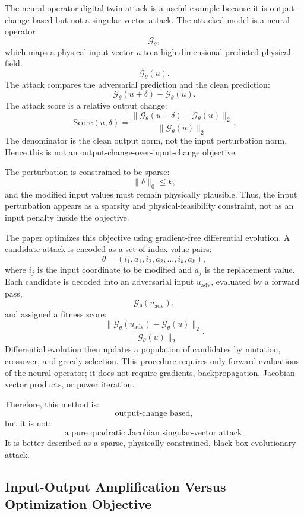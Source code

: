 \documentclass{article}
\begin{document}
The neural-operator digital-twin attack is a useful example because it is output-change based but not a singular-vector attack. The attacked model is a neural operator
\[
    \mathcal{G}_\theta,
\]
which maps a physical input vector \(u\) to a high-dimensional predicted physical field:
\[
    \mathcal{G}_\theta(u).
\]
The attack compares the adversarial prediction and the clean prediction:
\[
    \mathcal{G}_\theta(u+\delta)
    -
    \mathcal{G}_\theta(u).
\]
The attack score is a relative output change:
\[
    \mathrm{Score}(u,\delta)
    =
    \frac{
        \|\mathcal{G}_\theta(u+\delta)-\mathcal{G}_\theta(u)\|_2
    }{
        \|\mathcal{G}_\theta(u)\|_2
    }.
\]
The denominator is the clean output norm, not the input perturbation norm. Hence this is not an output-change-over-input-change objective.

The perturbation is constrained to be sparse:
\[
    \|\delta\|_0\le k,
\]
and the modified input values must remain physically plausible. Thus, the input perturbation appears as a sparsity and physical-feasibility constraint, not as an input penalty inside the objective.

The paper optimizes this objective using gradient-free differential evolution. A candidate attack is encoded as a set of index-value pairs:
\[
    \theta
    =
    (i_1,a_1,i_2,a_2,\ldots,i_k,a_k),
\]
where \(i_j\) is the input coordinate to be modified and \(a_j\) is the replacement value. Each candidate is decoded into an adversarial input \(u_{\mathrm{adv}}\), evaluated by a forward pass,
\[
    \mathcal{G}_\theta(u_{\mathrm{adv}}),
\]
and assigned a fitness score:
\[
    \frac{
        \|\mathcal{G}_\theta(u_{\mathrm{adv}})-\mathcal{G}_\theta(u)\|_2
    }{
        \|\mathcal{G}_\theta(u)\|_2
    }.
\]
Differential evolution then updates a population of candidates by mutation, crossover, and greedy selection. This procedure requires only forward evaluations of the neural operator; it does not require gradients, backpropagation, Jacobian-vector products, or power iteration.

Therefore, this method is:
\[
    \text{output-change based},
\]
but it is not:
\[
    \text{a pure quadratic Jacobian singular-vector attack}.
\]
It is better described as a sparse, physically constrained, black-box evolutionary attack.

\subsection{Input-Output Amplification Versus Optimization Objective}
\end{document}
